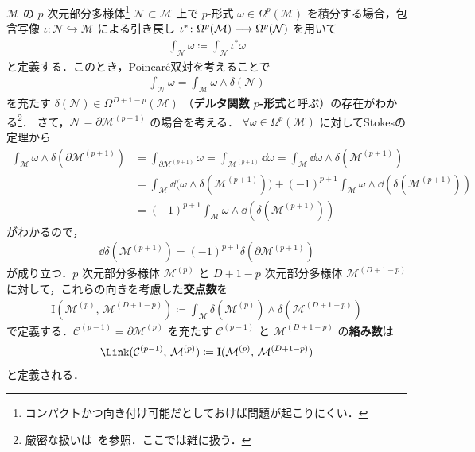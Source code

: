 \documentclass[TQFT_main]{subfiles}
\begin{document}
$\mathcal{M}$ の $p$ 次元部分多様体\footnote{コンパクトかつ向き付け可能だとしておけば問題が起こりにくい．} $\mathcal{N} \subset \mathcal{M}$ 上で $p$-形式 $\omega \in \Omega^p(\mathcal{M})$ を積分する場合，包含写像 $\iota \colon \mathcal{N} \hookrightarrow \mathcal{M}$ による引き戻し $\iota^* \colon \Omega^p(\mathcal{M}) \longrightarrow \Omega^p(\mathcal{N})$ を用いて
\begin{align}
    \int_{\mathcal{N}} \omega \coloneqq \int_\mathcal{N} \iota^*\omega
\end{align}
と定義する．このとき，Poincar\'{e}双対を考えることで
\begin{align}
    \int_{\mathcal{N}} \omega = \int_{\mathcal{M}} \omega \wedge \delta(\mathcal{N})
\end{align}
を充たす $\delta(\mathcal{N}) \in \Omega^{D+1-p}(\mathcal{M})$ （\textbf{デルタ関数 $p$-形式}と呼ぶ）の存在がわかる\footnote{厳密な扱いは~\cite[p.270]{Nicolaescu2022lecture}を参照．ここでは雑に扱う．}．
さて，$\mathcal{N} = \partial \mathcal{M}^{(p+1)}$ の場合を考える．
$\forall \omega \in \Omega^p (\mathcal{M})$ に対してStokesの定理から
\begin{align}
    \int_{\mathcal{M}} \omega \wedge \delta(\partial \mathcal{M}^{(p+1)}) 
    &= \int_{\partial \mathcal{M}^{(p+1)}} \omega 
    = \int_{\mathcal{M}^{(p+1)}} \dd{\omega} 
    = \int_\mathcal{M} \dd{\omega} \wedge \delta(\mathcal{M}^{(p+1)}) \\
    &= \int_{\mathcal{M}} \dd \bigl( \omega \wedge \delta(\mathcal{M}^{(p+1)}) \bigr) + (-1)^{p+1} \int_{\mathcal{M}} \omega \wedge \dd(\delta(\mathcal{M}^{(p+1)})) \\
    &= (-1)^{p+1} \int_{\mathcal{M}} \omega \wedge \dd (\delta(\mathcal{M}^{(p+1)}))
\end{align}
がわかるので，
\begin{align}
    \label{eq:def-Intersection}
    \dd{\delta(\mathcal{M}^{(p+1)})} = (-1)^{p+1} \delta(\partial \mathcal{M}^{(p+1)})
\end{align}
が成り立つ．$p$ 次元部分多様体 $\mathcal{M}^{(p)}$ と $D+1-p$ 次元部分多様体 $\mathcal{M}^{(D+1-p)}$ に対して，これらの向きを考慮した\textbf{交点数}を
\begin{align}
    \mathrm{I} (\mathcal{M}^{(p)},\, \mathcal{M}^{(D+1-p)}) \coloneqq \int_{\mathcal{M}} \delta(\mathcal{M}^{(p)}) \wedge \delta(\mathcal{M}^{(D+1-p)})
\end{align}
で定義する．$\mathcal{C}^{(p-1)} = \partial\mathcal{M}^{(p)}$ を充たす $\mathcal{C}^{(p-1)}$ と $\mathcal{M}^{(D+1-p)}$ の\textbf{絡み数}は
\begin{align}
    \label{eq:def-Link}
    \Link (\mathcal{C}^{(p-1)},\, \mathcal{M}^{(p)}) \coloneqq \mathrm{I} (\mathcal{M}^{(p)},\, \mathcal{M}^{(D+1-p)})
\end{align}
と定義される．
\end{document}

